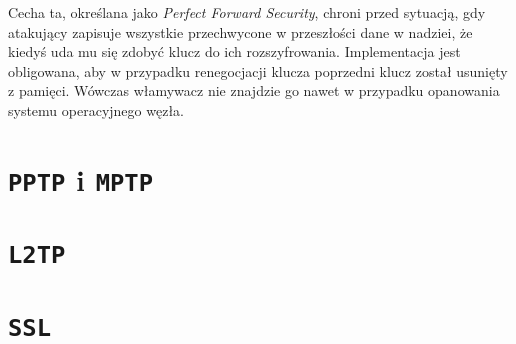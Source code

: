 \documentclass[a4paper]{article}
\begin{document}
Cecha ta, określana jako \emph{Perfect Forward Security}, chroni przed sytuacją, gdy atakujący zapisuje wszystkie przechwycone w przeszłości dane w nadziei, że kiedyś uda mu się zdobyć klucz do ich rozszyfrowania.
Implementacja jest obligowana, aby w przypadku renegocjacji klucza poprzedni klucz został usunięty z pamięci.
Wówczas włamywacz nie znajdzie go nawet w przypadku opanowania systemu operacyjnego węzła.
\section{{\tt PPTP} i {\tt MPTP}}
\section{\tt L2TP}
\section{\tt SSL}
\end{document}
